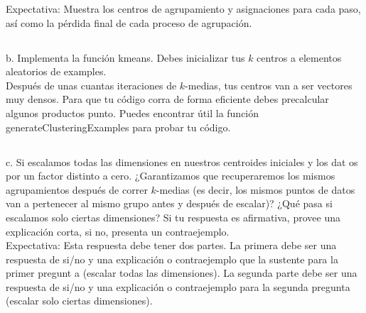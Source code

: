\documentclass{article}
\begin{document}
Expectativa: Muestra los centros de agrupamiento y asignaciones para cada paso, así como la pérdida final de cada proceso de agrupación.\\

\subsection{}
b. Implementa la función kmeans. Debes inicializar tus $k$ centros a elementos aleatorios de examples.\\

Después de unas cuantas iteraciones de $k$-medias, tus centros van a ser vectores muy densos. Para que tu código corra de forma eficiente debes precalcular algunos productos punto. Puedes encontrar útil la función generateClusteringExamples para probar tu código.\\

\subsection{}
c. Si escalamos todas las dimensiones en nuestros centroides iniciales y los dat os por un factor distinto a cero. ¿Garantizamos que recuperaremos los mismos agrupamientos después de correr $k$-medias (es decir, los mismos puntos de datos van a pertenecer al mismo grupo antes y después de escalar)? ¿Qué pasa si escalamos solo ciertas dimensiones? Si tu respuesta es afirmativa, provee una explicación corta, si no, presenta un contraejemplo.\\
Expectativa: Esta respuesta debe tener dos partes. La primera debe ser una respuesta de si/no y una explicación o contraejemplo que la sustente para la primer pregunt a (escalar todas las dimensiones). La segunda parte debe ser una respuesta de si/no y una explicación o contraejemplo para la segunda pregunta (escalar solo ciertas dimensiones).
\end{document}
